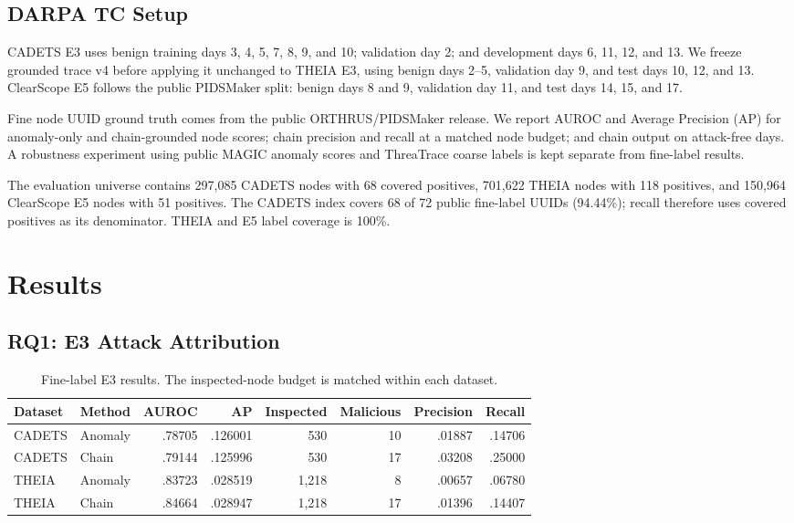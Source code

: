 \documentclass[runningheads]{llncs}
\begin{document}
\subsection{DARPA TC Setup}

CADETS E3 uses benign training days 3, 4, 5, 7, 8, 9, and 10; validation day 2; and development days 6, 11, 12, and 13. We freeze grounded trace v4 before applying it unchanged to THEIA E3, using benign days 2--5, validation day 9, and test days 10, 12, and 13. ClearScope E5 follows the public PIDSMaker split: benign days 8 and 9, validation day 11, and test days 14, 15, and 17.

Fine node UUID ground truth comes from the public ORTHRUS/PIDSMaker release. We report AUROC and Average Precision (AP) for anomaly-only and chain-grounded node scores; chain precision and recall at a matched node budget; and chain output on attack-free days. A robustness experiment using public MAGIC anomaly scores and ThreaTrace coarse labels is kept separate from fine-label results.

The evaluation universe contains 297,085 CADETS nodes with 68 covered positives, 701,622 THEIA nodes with 118 positives, and 150,964 ClearScope E5 nodes with 51 positives. The CADETS index covers 68 of 72 public fine-label UUIDs (94.44\%); recall therefore uses covered positives as its denominator. THEIA and E5 label coverage is 100\%.

\section{Results}

\subsection{RQ1: E3 Attack Attribution}

\begin{table}[t]
\caption{Fine-label E3 results. The inspected-node budget is matched within each dataset.}
\label{tab:e3}
\centering
\scriptsize
\setlength{\tabcolsep}{3.3pt}
\begin{tabular}{llrrrrrr}
\toprule
Dataset & Method & AUROC & AP & Inspected & Malicious & Precision & Recall \\
\midrule
CADETS & Anomaly & .78705 & .126001 & 530 & 10 & .01887 & .14706 \\
CADETS & Chain & .79144 & .125996 & 530 & 17 & .03208 & .25000 \\
THEIA & Anomaly & .83723 & .028519 & 1,218 & 8 & .00657 & .06780 \\
THEIA & Chain & .84664 & .028947 & 1,218 & 17 & .01396 & .14407 \\
\bottomrule
\end{tabular}
\end{table}
\end{document}
